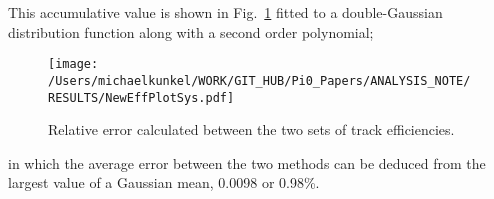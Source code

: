 		This accumulative value is shown in Fig.~\ref{fig:toteff_error} fitted to a double-Gaussian distribution function along with a second order polynomial;
		\begin{figure}[h!]\begin{center}
				\texttt{[image: /Users/michaelkunkel/WORK/GIT\_HUB/Pi0\_Papers/ANALYSIS\_NOTE/RESULTS/NewEffPlotSys.pdf]}
				\caption{Relative error calculated between the two sets of track efficiencies.}\label{fig:toteff_error}
			\end{center}\end{figure}
			in which the average error between the two methods can be deduced from the largest value of a Gaussian mean, 0.0098 or 0.98\%.		
\FloatBarrier